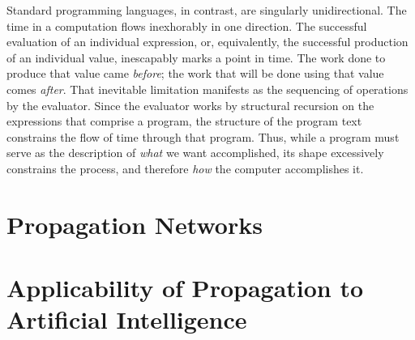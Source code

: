 \documentclass[12pt]{article}
\begin{document}
Standard programming languages, in contrast, are singularly
unidirectional.  The time in a computation flows inexhorably in one
direction.  The successful
evaluation of an individual expression, or, equivalently, the successful
production of an individual value, inescapably marks a point in time.  The work
done to produce that value came \emph{before}; the work that will be
done using that value comes \emph{after}.
That inevitable limitation manifests as the sequencing of operations
by the evaluator.  Since the evaluator works by structural recursion
on the expressions that comprise a program, the structure of the
program text constrains the flow of time through that program.
Thus, while a program must serve as the description of
\emph{what} we want accomplished, its shape excessively constrains the
process, and therefore \emph{how} the computer accomplishes it.


\section{Propagation Networks}


\section{Applicability of Propagation to Artificial Intelligence}


\end{document}
